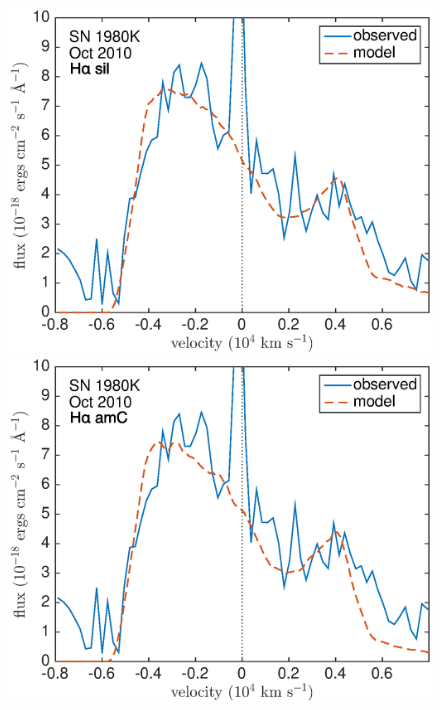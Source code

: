 \begin{figure}[!t]
\centering
\includegraphics[scale=0.4,clip=true, trim=20 0 40 20]{chapters/chapter6/figs/80K/clumped/Ha}
\includegraphics[scale=0.4,clip=true, trim=20 0 40 20]{chapters/chapter6/figs/80K/clumped/Ha_amC}


\end{figure}
